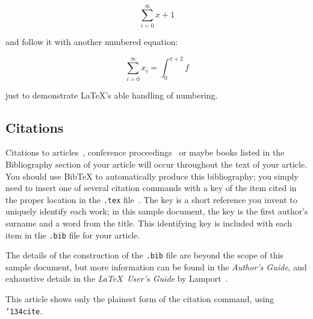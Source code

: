 \documentclass[sigconf]{acmart}
\begin{document}
\begin{displaymath}
  \sum_{i=0}^{\infty} x + 1
\end{displaymath}

and follow it with another numbered equation:

\begin{equation}
  \sum_{i=0}^{\infty}x_i=\int_{0}^{\pi+2} f
\end{equation}

just to demonstrate \LaTeX's able handling of numbering.

\subsection{Citations}

Citations to articles~\cite{bowman:reasoning, clark:pct, braams:babel,
  herlihy:methodology}, conference proceedings~\cite{clark:pct} or
maybe books \cite{Lamport:LaTeX, salas:calculus} listed in the
Bibliography section of your article will occur throughout the text of
your article.  You should use BibTeX to automatically produce this
bibliography; you simply need to insert one of several citation
commands with a key of the item cited in the proper location in the
\texttt{.tex} file~\cite{Lamport:LaTeX}.  The key is a short reference
you invent to uniquely identify each work; in this sample document,
the key is the first author's surname and a word from the title.  This
identifying key is included with each item in the \texttt{.bib} file
for your article.

The details of the construction of the \texttt{.bib} file are beyond
the scope of this sample document, but more information can be found
in the \textit{Author's Guide}, and exhaustive details in the
\textit{\LaTeX\ User's Guide} by Lamport~.

This article shows only the plainest form of the citation command,
using \texttt{{\char'134}cite}.
\end{document}
